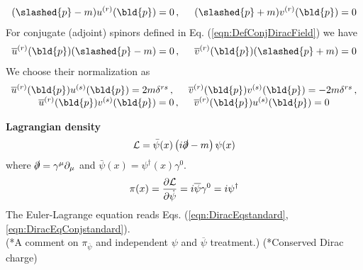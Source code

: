 \begin{eqnarray}
(\slashed{p} - m) u^{(r)}(\bld{p}) = 0\,,
\hspace{5mm}
(\slashed{p} + m) v^{(r)}(\bld{p}) = 0
\label{eqn:DiracEqDiracspinors}
\end{eqnarray}
For conjugate (adjoint) spinors defined in Eq. (\ref{eqn:DefConjDiracField}) we have
\begin{eqnarray}
\overline{u}^{(r)}(\bld{p}) (\slashed{p} - m) = 0\,,
\hspace{5mm}
\overline{v}^{(r)}(\bld{p}) (\slashed{p} + m) = 0
\label{eqn:DiracEqConjspinors}
\end{eqnarray}
We choose their normalization
 as
\begin{eqnarray}
\begin{array}{c}
\overline{u}^{(r)}(\bld{p})
u^{(s)}(\bld{p})
= 2m \delta^{rs}\,,
\hspace{5mm}
\overline{v}^{(r)}(\bld{p})
v^{(s)}(\bld{p})
= -2m \delta^{rs}\,,
\\
\overline{u}^{(r)}(\bld{p})
v^{(s)}(\bld{p})
= 0\,,
\hspace{5mm}
\overline{v}^{(r)}(\bld{p})
u^{(s)}(\bld{p})
= 0
\end{array}
\end{eqnarray}

\noindent
{\bf Lagrangian density}
\begin{equation}
{\cal L} =  \bar{\psi}(x) \left(
i \slashed{\partial}  - m \right)
 \psi(x)
\end{equation}
where $\slashed{\partial} = \gamma^\mu \partial_\mu$ and
$\bar{\psi}(x) = \psi^\dagger (x) \gamma^0$.
\begin{eqnarray}
\pi(x) =
\frac{\partial {\cal L}}{\partial \dot{\psi}}
=
i \overline{\psi} \gamma^0
= i \psi^\dagger
\end{eqnarray}
The Euler-Lagrange equation reads
Eqs. (\ref{eqn:DiracEqstandard}, \ref{eqn:DiracEqConjstandard}).\\
(*A comment on $\pi_{\overline{\psi}}$ and independent $\psi$ and $\overline{\psi}$ treatment.)
(*Conserved Dirac charge)

